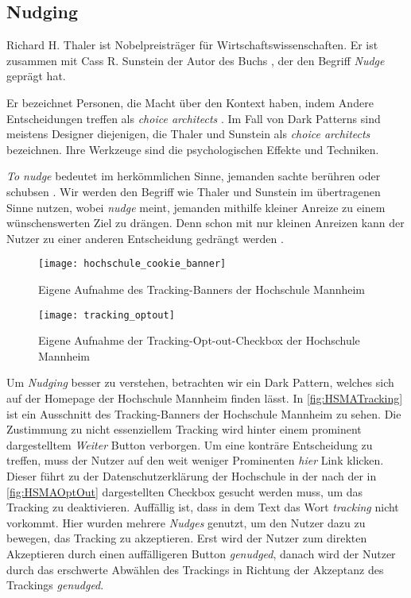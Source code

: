\documentclass[conference,compsoc,final,a4paper]{IEEEtran}
\begin{document}
\subsection{Nudging}
Richard H. Thaler ist Nobelpreisträger für Wirtschaftswissenschaften. Er ist zusammen mit Cass R. Sunstein der Autor des Buchs  \autocite{Thaler2008}, der den Begriff \textit{Nudge} geprägt hat.

Er bezeichnet Personen, die Macht über den Kontext haben, indem Andere Entscheidungen treffen als \textit{choice architects} \autocite[S. 3]{Thaler2008}. Im Fall von Dark Patterns sind meistens Designer diejenigen, die Thaler und Sunstein als \textit{choice architects} bezeichnen. Ihre Werkzeuge sind die psychologischen Effekte und Techniken.

\textit{To nudge} bedeutet im herkömmlichen Sinne, jemanden sachte berühren oder schubsen \autocite{MerriamWebsterNudge}. Wir werden den Begriff wie Thaler und Sunstein im übertragenen Sinne nutzen, wobei \textit{nudge} meint, jemanden mithilfe kleiner Anreize zu einem wünschenswerten Ziel zu drängen. Denn schon mit nur kleinen Anreizen kann der Nutzer zu einer anderen Entscheidung gedrängt werden \autocite{Narayanan2020}.

\begin{figure}[!ht]
  \centering
  \texttt{[image: hochschule\_cookie\_banner]}
  \caption{Eigene Aufnahme des Tracking-Banners der Hochschule Mannheim~\autocite{HSMAWebsite2021}}
  \label{fig:HSMATracking}
\end{figure}

\begin{figure}[!ht]
  \centering
  \texttt{[image: tracking\_optout]}
  \caption{Eigene Aufnahme der Tracking-Opt-out-Checkbox der Hochschule Mannheim~\autocite{HSMAWebsite2021}}
  \label{fig:HSMAOptOut}
\end{figure}

Um \textit{Nudging} besser zu verstehen, betrachten wir ein Dark Pattern, welches sich auf der Homepage der Hochschule Mannheim finden lässt. In \autoref{fig:HSMATracking} ist ein Ausschnitt des Tracking-Banners der Hochschule Mannheim zu sehen. Die Zustimmung zu nicht essenziellem Tracking wird hinter einem prominent dargestelltem \textit{Weiter} Button verborgen. Um eine konträre Entscheidung zu treffen, muss der Nutzer auf den weit weniger Prominenten \textit{hier} Link klicken. Dieser führt zu der Datenschutzerklärung der Hochschule in der nach der in \autoref{fig:HSMAOptOut} dargestellten Checkbox gesucht werden muss, um das Tracking zu deaktivieren. Auffällig ist, dass in dem Text das Wort \textit{tracking} nicht vorkommt. Hier wurden mehrere \textit{Nudges} genutzt, um den Nutzer dazu zu bewegen, das Tracking zu akzeptieren. Erst wird der Nutzer zum direkten Akzeptieren durch einen auffälligeren Button \textit{genudged}, danach wird der Nutzer durch das erschwerte Abwählen des Trackings in Richtung der Akzeptanz des Trackings \textit{genudged}.
\end{document}
